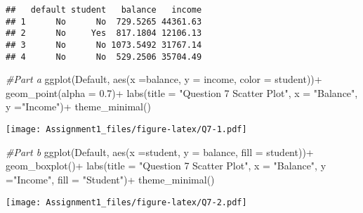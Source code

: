 \documentclass[
]{article}
\newenvironment{Shaded}{\begin{snugshade}}{\end{snugshade}}
\newcommand{\AttributeTok}[1]{\textcolor[rgb]{0.77,0.63,0.00}{#1}}
\newcommand{\CommentTok}[1]{\textcolor[rgb]{0.56,0.35,0.01}{\textit{#1}}}
\newcommand{\FloatTok}[1]{\textcolor[rgb]{0.00,0.00,0.81}{#1}}
\newcommand{\FunctionTok}[1]{\textcolor[rgb]{0.00,0.00,0.00}{#1}}
\newcommand{\NormalTok}[1]{#1}
\newcommand{\SpecialCharTok}[1]{\textcolor[rgb]{0.00,0.00,0.00}{#1}}
\newcommand{\StringTok}[1]{\textcolor[rgb]{0.31,0.60,0.02}{#1}}
\begin{document}
\begin{verbatim}
##   default student   balance   income
## 1      No      No  729.5265 44361.63
## 2      No     Yes  817.1804 12106.13
## 3      No      No 1073.5492 31767.14
## 4      No      No  529.2506 35704.49
\end{verbatim}

\begin{Shaded}
\begin{Highlighting}[]
\CommentTok{\#Part a}
\FunctionTok{ggplot}\NormalTok{(Default, }\FunctionTok{aes}\NormalTok{(}\AttributeTok{x =}\NormalTok{balance, }\AttributeTok{y =}\NormalTok{ income, }\AttributeTok{color =}\NormalTok{ student))}\SpecialCharTok{+}
  \FunctionTok{geom\_point}\NormalTok{(}\AttributeTok{alpha =} \FloatTok{0.7}\NormalTok{)}\SpecialCharTok{+}
  \FunctionTok{labs}\NormalTok{(}\AttributeTok{title =} \StringTok{"Question 7 Scatter Plot"}\NormalTok{, }\AttributeTok{x =} \StringTok{"Balance"}\NormalTok{, }\AttributeTok{y =}\StringTok{"Income"}\NormalTok{)}\SpecialCharTok{+}
  \FunctionTok{theme\_minimal}\NormalTok{()}
\end{Highlighting}
\end{Shaded}

\texttt{[image: Assignment1\_files/figure-latex/Q7-1.pdf]}

\begin{Shaded}
\begin{Highlighting}[]
\CommentTok{\#Part b}
\FunctionTok{ggplot}\NormalTok{(Default, }\FunctionTok{aes}\NormalTok{(}\AttributeTok{x =}\NormalTok{student, }\AttributeTok{y =}\NormalTok{ balance, }\AttributeTok{fill =}\NormalTok{ student))}\SpecialCharTok{+}
  \FunctionTok{geom\_boxplot}\NormalTok{()}\SpecialCharTok{+}
  \FunctionTok{labs}\NormalTok{(}\AttributeTok{title =} \StringTok{"Question 7 Scatter Plot"}\NormalTok{, }\AttributeTok{x =} \StringTok{"Balance"}\NormalTok{, }\AttributeTok{y =}\StringTok{"Income"}\NormalTok{, }\AttributeTok{fill =} \StringTok{"Student"}\NormalTok{)}\SpecialCharTok{+}
  \FunctionTok{theme\_minimal}\NormalTok{()}
\end{Highlighting}
\end{Shaded}

\texttt{[image: Assignment1\_files/figure-latex/Q7-2.pdf]}
\end{document}
